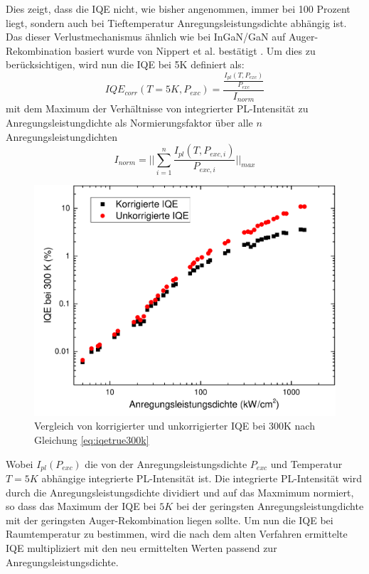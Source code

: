 \vspace{0.1cm}
\noindent
Dies zeigt, dass die IQE nicht, wie bisher angenommen, immer bei 100 Prozent liegt, sondern auch bei Tieftemperatur Anregungsleistungsdichte abhängig ist. Das dieser Verlustmechanismus ähnlich wie bei InGaN/GaN auf Auger-Rekombination basiert wurde von Nippert et al. bestätigt \cite{doi:10.1063/1.4965298}. 
Um dies zu berücksichtigen, wird nun die IQE bei 5K definiert als:
%
\begin{equation}
    IQE_{corr}(T = 5K, P_{exc}) = \frac{ \frac{I_{pl}(T,P_{exc}) }{P_{exc} } } { I_{norm}}
    \label{eq:iqetrue5k}
\end{equation}
%
mit dem Maximum der Verhältnisse von integrierter PL-Intensität zu Anregungsleistungdichte als  Normierungsfaktor über alle $n$ Anregungsleistungdichten
\begin{equation}
    I_{norm} = \lvert \lvert \sum_{i=1}^{n} \frac{I_{pl}(T,P_{exc,i})}{P_{exc,i}} \lvert \lvert_{max}
    \label{eq:iplnorm}
\end{equation}
%
\begin{figure}[htb]
\centering
    \begin{minipage}[t]{0.49\linewidth}
        \includegraphics[width=\linewidth]{Bilder/korrigierteIQE300K.pdf}
        \caption{Vergleich von korrigierter und unkorrigierter IQE bei 300K nach Gleichung \ref{eq:iqetrue300k} }
        \label{fig:trueiqe300k}
    \end{minipage}
\end{figure}
\vspace{0.1cm}
\noindent
%
Wobei $I_{pl}(P_{exc})$ die von der Anregungsleistungsdichte $P_{exc}$ und Temperatur $T = 5K$ abhängige integrierte PL-Intensität ist. Die integrierte PL-Intensität wird durch die Anregungsleistungsdichte dividiert und auf das Maxmimum normiert, so dass das Maximum der IQE bei $5K$ bei der geringsten Anregungsleistungdichte mit der geringsten Auger-Rekombination liegen sollte. Um nun die IQE bei Raumtemperatur zu bestimmen, wird die nach dem alten Verfahren ermittelte IQE multipliziert mit den neu ermittelten Werten passend zur Anregungsleistungsdichte. 
